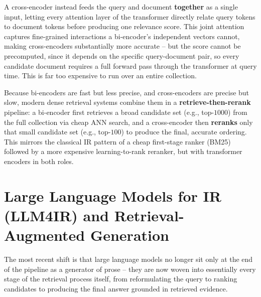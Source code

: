 \documentclass[11pt, a4paper]{article}
\begin{document}
\begin{defbox}
A cross-encoder instead feeds the query and document \textbf{together} as a single input, letting every attention layer of the transformer directly relate query tokens to document tokens before producing one relevance score. This joint attention captures fine-grained interactions a bi-encoder's independent vectors cannot, making cross-encoders substantially more accurate -- but the score cannot be precomputed, since it depends on the specific query-document pair, so every candidate document requires a full forward pass through the transformer at query time. This is far too expensive to run over an entire collection.
\end{defbox}

\begin{formulabox}
Because bi-encoders are fast but less precise, and cross-encoders are precise but slow, modern dense retrieval systems combine them in a \textbf{retrieve-then-rerank} pipeline: a bi-encoder first retrieves a broad candidate set (e.g., top-$1000$) from the full collection via cheap ANN search, and a cross-encoder then \textbf{reranks} only that small candidate set (e.g., top-$100$) to produce the final, accurate ordering. This mirrors the classical IR pattern of a cheap first-stage ranker (BM25) followed by a more expensive learning-to-rank reranker, but with transformer encoders in both roles.
\end{formulabox}

\section{Large Language Models for IR (LLM4IR) and Retrieval-Augmented Generation}

The most recent shift is that large language models no longer sit only at the end of the pipeline as a generator of prose -- they are now woven into essentially every stage of the retrieval process itself, from reformulating the query to ranking candidates to producing the final answer grounded in retrieved evidence.
\end{document}
